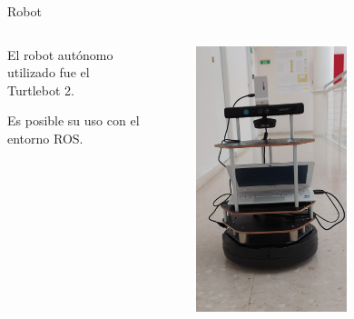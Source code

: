 \documentclass{beamer}
\begin{document}
  \begin{frame}{Robot}
    \begin{columns}
      \begin{column}{0.5\textwidth}
        El robot autónomo utilizado fue el Turtlebot 2.

        \vspace{0.5cm}
        Es posible su uso con el entorno ROS.
      \end{column}
      \begin{column}{0.5\textwidth}  
        \begin{figure}[H]
          \centering
          \includegraphics[width=0.65\textwidth]{pic/robot_fisica.jpg}
          \label{fig:robot}
      \end{figure}
      \end{column}
    \end{columns}
  \end{frame}
\end{document}
